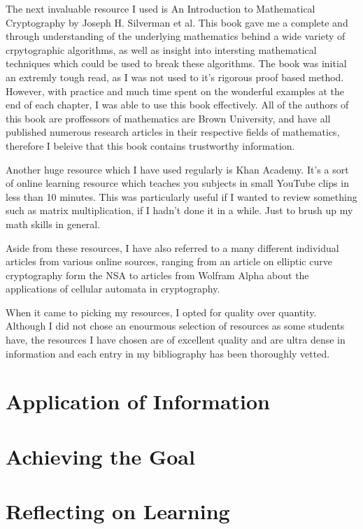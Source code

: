 \documentclass[12pt, a4paper, draft]{report}
\begin{document}
The next invaluable resource I used is An Introduction to Mathematical
Cryptography by Joseph H. Silverman et al\footnotemark. This book gave me
a complete and through understanding of the underlying mathematics behind
a wide variety of crpytographic algorithms, as well as insight into
intersting mathematical techniques which could be used to break these
algorithms. The book was initial an extremly tough read, as I was not used
to it's rigorous proof based method. However, with practice and much time
spent on the wonderful examples at the end of each chapter, I was able to
use this book effectively. All of the authors of this book are proffessors
of mathematics are Brown University, and have all published numerous
research articles in their respective fields of mathematics, therefore I
beleive that this book contains trustworthy information.



Another huge resource which I have used regularly is Khan Academy. It's
a sort of online learning resource which teaches you subjects in small
YouTube clips in less than 10 minutes. This was particularly useful if I
wanted to review something such as matrix multiplication, if I hadn't done
it in a while. Just to brush up my math skills in general.

Aside from these resources, I have also referred to a many different
individual articles from various online sources, ranging from an article on
elliptic curve cryptography form the NSA to articles from Wolfram Alpha
about the applications of cellular automata in cryptography.

When it came to picking my resources, I opted for quality over quantity.
Although I did not chose an enourmous selection of resources as some
students have, the resources I have chosen are of excellent quality and
are ultra dense in information and each entry in my bibliography has
been thoroughly vetted.

\section{Application of Information}

\section{Achieving the Goal}

\section{Reflecting on Learning}
\end{document}
